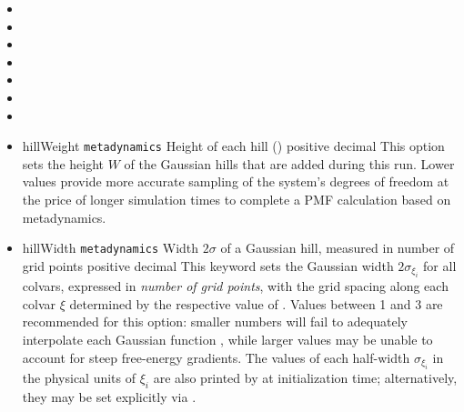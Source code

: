 \begin{itemize}

\item {}
\item {}
\item {}
\item {}
\item {}
\item {}
\item {}

\item %
  \key
    {hillWeight}{%
    \texttt{metadynamics}}{%
    Height of each hill (\energyunit)}{%
    positive decimal}{%
    This option sets the height $W$ of the Gaussian hills that are added during this run.
    Lower values provide more accurate sampling of the system's degrees of freedom at the price of longer simulation times to complete a PMF calculation based on metadynamics.}

\item %
  \key
    {hillWidth}{%
    \texttt{metadynamics}}{%
    Width $2\sigma$ of a Gaussian hill, measured in number of grid points}{%
    positive decimal}{%
    This keyword sets the Gaussian width $2\sigma_{\xi_{i}}$ for all colvars, expressed in \emph{number of grid points}, with the grid spacing along each colvar $\xi$ determined by the respective value of .
    Values between 1 and 3 are recommended for this option: smaller numbers will fail to adequately interpolate each Gaussian function \cite{Fiorin2013}, while larger values may be unable to account for steep free-energy gradients.
    The values of each half-width $\sigma_{\xi_{i}}$ in the physical units of $\xi_{i}$ are also printed by \MDENGINE{} at initialization time; alternatively, they may be set explicitly via .
    }


\end{itemize}
